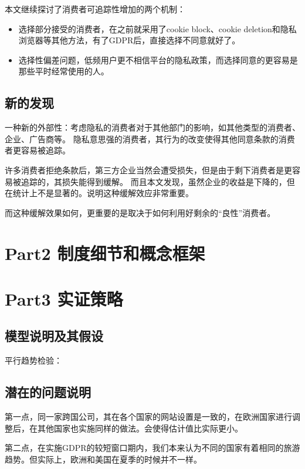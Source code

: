 \documentclass{article}
\begin{document}
本文继续探讨了消费者可追踪性增加的两个机制：
\begin{itemize}
    \item 选择部分接受的消费者，在之前就采用了cookie block、cookie deletion和隐私浏览器等其他方法，有了GDPR后，直接选择不同意就好了。
    \item 选择性偏差问题，低频用户更不相信平台的隐私政策，而选择同意的更容易是那些平时经常使用的人。
\end{itemize}

\subsection*{新的发现}
一种新的外部性：考虑隐私的消费者对于其他部门的影响，如其他类型的消费者、企业、广告商等。
隐私意思强的消费者，其行为的改变使得其他同意条款的消费者更容易被追踪。

许多消费者拒绝条款后，第三方企业当然会遭受损失，但是由于剩下消费者是更容易被追踪的，其损失能得到缓解。
而且本文发现，虽然企业的收益是下降的，但在统计上不是显著的。说明这种缓解效应非常重要。

而这种缓解效果如何，更重要的是取决于如何利用好剩余的“良性”消费者。

\section*{Part2 制度细节和概念框架}


\section*{Part3 实证策略}

\subsection*{模型说明及其假设}
平行趋势检验：

\subsection*{潜在的问题说明}
第一点，同一家跨国公司，其在各个国家的网站设置是一致的，在欧洲国家进行调整后，在其他国家也实施同样的做法。会使得估计值比实际更小。

第二点，在实施GDPR的较短窗口期内，我们本来认为不同的国家有着相同的旅游趋势。但实际上，欧洲和美国在夏季的时候并不一样。
\end{document}
